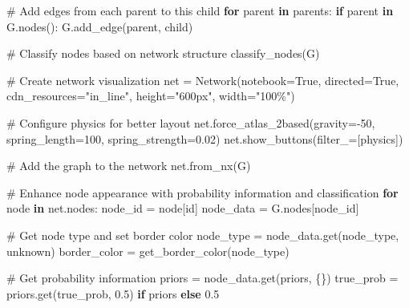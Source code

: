 \documentclass[
  11pt,
  letterpaper,
]{book}
\newenvironment{Shaded}{\begin{snugshade}}{\end{snugshade}}
\newcommand{\CommentTok}[1]{\textcolor[rgb]{0.37,0.37,0.37}{#1}}
\newcommand{\ControlFlowTok}[1]{\textcolor[rgb]{0.00,0.23,0.31}{\textbf{#1}}}
\newcommand{\DecValTok}[1]{\textcolor[rgb]{0.68,0.00,0.00}{#1}}
\newcommand{\FloatTok}[1]{\textcolor[rgb]{0.68,0.00,0.00}{#1}}
\newcommand{\KeywordTok}[1]{\textcolor[rgb]{0.00,0.23,0.31}{\textbf{#1}}}
\newcommand{\NormalTok}[1]{\textcolor[rgb]{0.00,0.23,0.31}{#1}}
\newcommand{\OperatorTok}[1]{\textcolor[rgb]{0.37,0.37,0.37}{#1}}
\newcommand{\StringTok}[1]{\textcolor[rgb]{0.13,0.47,0.30}{#1}}
\newcommand{\VariableTok}[1]{\textcolor[rgb]{0.07,0.07,0.07}{#1}}
\begin{document}
\begin{Shaded}
\begin{Highlighting}[]
        \CommentTok{\# Add edges from each parent to this child}
        \ControlFlowTok{for}\NormalTok{ parent }\KeywordTok{in}\NormalTok{ parents:}
            \ControlFlowTok{if}\NormalTok{ parent }\KeywordTok{in}\NormalTok{ G.nodes():}
\NormalTok{                G.add\_edge(parent, child)}

    \CommentTok{\# Classify nodes based on network structure}
\NormalTok{    classify\_nodes(G)}

    \CommentTok{\# Create network visualization}
\NormalTok{    net }\OperatorTok{=}\NormalTok{ Network(notebook}\OperatorTok{=}\VariableTok{True}\NormalTok{, directed}\OperatorTok{=}\VariableTok{True}\NormalTok{, cdn\_resources}\OperatorTok{=}\StringTok{"in\_line"}\NormalTok{, height}\OperatorTok{=}\StringTok{"600px"}\NormalTok{, width}\OperatorTok{=}\StringTok{"100\%"}\NormalTok{)}

    \CommentTok{\# Configure physics for better layout}
\NormalTok{    net.force\_atlas\_2based(gravity}\OperatorTok{={-}}\DecValTok{50}\NormalTok{, spring\_length}\OperatorTok{=}\DecValTok{100}\NormalTok{, spring\_strength}\OperatorTok{=}\FloatTok{0.02}\NormalTok{)}
\NormalTok{    net.show\_buttons(filter\_}\OperatorTok{=}\NormalTok{[}\StringTok{\textquotesingle{}physics\textquotesingle{}}\NormalTok{])}

    \CommentTok{\# Add the graph to the network}
\NormalTok{    net.from\_nx(G)}

    \CommentTok{\# Enhance node appearance with probability information and classification}
    \ControlFlowTok{for}\NormalTok{ node }\KeywordTok{in}\NormalTok{ net.nodes:}
\NormalTok{        node\_id }\OperatorTok{=}\NormalTok{ node[}\StringTok{\textquotesingle{}id\textquotesingle{}}\NormalTok{]}
\NormalTok{        node\_data }\OperatorTok{=}\NormalTok{ G.nodes[node\_id]}

        \CommentTok{\# Get node type and set border color}
\NormalTok{        node\_type }\OperatorTok{=}\NormalTok{ node\_data.get(}\StringTok{\textquotesingle{}node\_type\textquotesingle{}}\NormalTok{, }\StringTok{\textquotesingle{}unknown\textquotesingle{}}\NormalTok{)}
\NormalTok{        border\_color }\OperatorTok{=}\NormalTok{ get\_border\_color(node\_type)}

        \CommentTok{\# Get probability information}
\NormalTok{        priors }\OperatorTok{=}\NormalTok{ node\_data.get(}\StringTok{\textquotesingle{}priors\textquotesingle{}}\NormalTok{, \{\})}
\NormalTok{        true\_prob }\OperatorTok{=}\NormalTok{ priors.get(}\StringTok{\textquotesingle{}true\_prob\textquotesingle{}}\NormalTok{, }\FloatTok{0.5}\NormalTok{) }\ControlFlowTok{if}\NormalTok{ priors }\ControlFlowTok{else} \FloatTok{0.5}


\end{Highlighting}
\end{Shaded}
\end{document}
